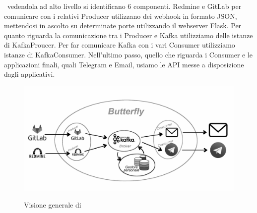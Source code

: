 \progetto\ vedendola ad alto livello si identificano 6 componenti. Redmine e GitLab per comunicare con i relativi Producer utilizzano dei webhook in formato JSON,
mettendosi in ascolto su determinate porte utilizzando il webserver Flask. Per quanto riguarda la comunicazione tra i Producer e Kafka utilizziamo delle istanze
di KafkaProucer. Per far comunicare Kafka con i vari Consumer utilizziamo istanze di KafkaConsumer. Nell'ultimo passo, quello che riguarda i Consumer e le applicazioni finali, quali Telegram e Email, usiamo le API messe a disposizione dagli applicativi.

\begin{figure}[H]
    \centering
    \includegraphics[width=\textwidth]{img/butterfly.png}\\
    \caption{Visione generale di \progetto}
    \label{fig:butterfly}
\end{figure}

